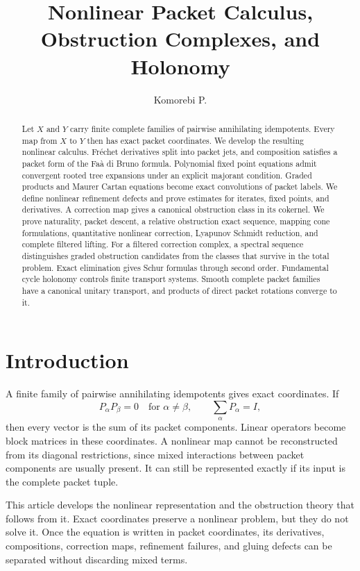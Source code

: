 \documentclass{aomart}
\title[Nonlinear packet calculus]{Nonlinear Packet Calculus, Obstruction Complexes, and Holonomy}
\author[Komorebi P.]{Komorebi P.}
\theoremstyle{definition}
\theoremstyle{remark}
\begin{document}
\begin{abstract}
Let $X$ and $Y$ carry finite complete families of pairwise annihilating idempotents.  Every map from $X$ to $Y$ then has exact packet coordinates.  We develop the resulting nonlinear calculus.  Fr\'echet derivatives split into packet jets, and composition satisfies a packet form of the Fa\`a di Bruno formula.  Polynomial fixed point equations admit convergent rooted tree expansions under an explicit majorant condition.  Graded products and Maurer Cartan equations become exact convolutions of packet labels.  We define nonlinear refinement defects and prove estimates for iterates, fixed points, and derivatives.  A correction map gives a canonical obstruction class in its cokernel.  We prove naturality, packet descent, a relative obstruction exact sequence, mapping cone formulations, quantitative nonlinear correction, Lyapunov Schmidt reduction, and complete filtered lifting.  For a filtered correction complex, a spectral sequence distinguishes graded obstruction candidates from the classes that survive in the total problem.  Exact elimination gives Schur formulas through second order.  Fundamental cycle holonomy controls finite transport systems.  Smooth complete packet families have a canonical unitary transport, and products of direct packet rotations converge to it.
\end{abstract}
\maketitle
\thispagestyle{plain}

\section{Introduction}\label{sec:introduction}

A finite family of pairwise annihilating idempotents gives exact coordinates.  If
\[
P_\alpha P_\beta=0
\quad\text{for }\alpha\ne\beta,
\qquad
\sum_\alpha P_\alpha=I,
\]
then every vector is the sum of its packet components.  Linear operators become block matrices in these coordinates.  A nonlinear map cannot be reconstructed from its diagonal restrictions, since mixed interactions between packet components are usually present.  It can still be represented exactly if its input is the complete packet tuple.

This article develops the nonlinear representation and the obstruction theory that follows from it.  Exact coordinates preserve a nonlinear problem, but they do not solve it.  Once the equation is written in packet coordinates, its derivatives, compositions, correction maps, refinement failures, and gluing defects can be separated without discarding mixed terms.
\end{document}

